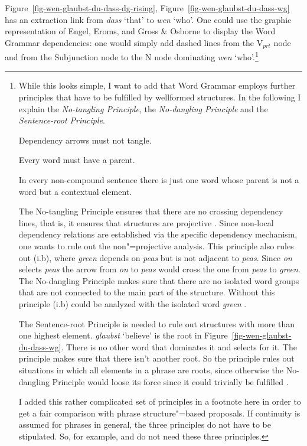 Figure~\ref{fig-wen-glaubst-du-dass-dg-rising}, Figure~\ref{fig-wen-glaubst-du-dass-wg} has an
extraction link from \emph{dass} `that' to \emph{wen} `who'. One could use the graphic representation of Engel,
Eroms, and Gross \& Osborne to display the Word Grammar dependencies: one would simply add dashed
lines from the V$_{prt}$ node and from the Subjunction node to the N node dominating \emph{wen}
`who'.\footnote{
While this looks simple, I want to add that Word Grammar employs further principles that have to be
fulfilled by wellformed  structures. In the following I explain the \emph{No-tangling Principle},
the \emph{No-dangling Principle} and the \emph{Sentence-root Principle}.
\begin{principle}
  Dependency arrows must not tangle.
\end{principle}

\begin{principle}
Every word must have a parent.
\end{principle}

\begin{principle}
In every non-compound sentence there is just one word whose parent
is not a word but a contextual element.
\end{principle}

The No-tangling Principle ensures that there are no crossing dependency lines, that is, it ensures
that structures are projective \citep[]{Hudson2000a}. Since non-local dependency relations are established via the
specific dependency mechanism, one wants to rule out the non"=projective analysis. This principle
also rules out (i.b), where \emph{green} depends on \emph{peas} but is not adjacent to
\emph{peas}. Since \emph{on} selects \emph{peas} the arrow from \emph{on} to \emph{peas} would cross
the one from \emph{peas} to \emph{green}.
\eal
{}
\zl
The No-dangling Principle makes sure that there are no isolated word groups that are not connected to the main part
of the structure. Without this principle (i.b) could be analyzed with the isolated word
\emph{green} \citep[]{Hudson2000a}.

The Sentence-root Principle is needed to rule out structures with more than one highest
element. \emph{glaubst} `believe' is the root in Figure~\ref{fig-wen-glaubst-du-dass-wg}. There is
no other word that dominates it and selects for it. The principle makes sure that there isn't another
root. So the principle rules out situations in which all elements in a phrase are roots, since
otherwise the No-dangling Principle would loose its force since it could trivially be fulfilled \citep[]{Hudson2000a}.

I added this rather complicated set of principles in a footnote here in order to get a fair
comparison with phrase structure"=based proposals. If continuity is assumed for phrases in general,
the three principles do not have to be stipulated. So, for example, \lfg and \hpsg
do not need these three principles.
}

